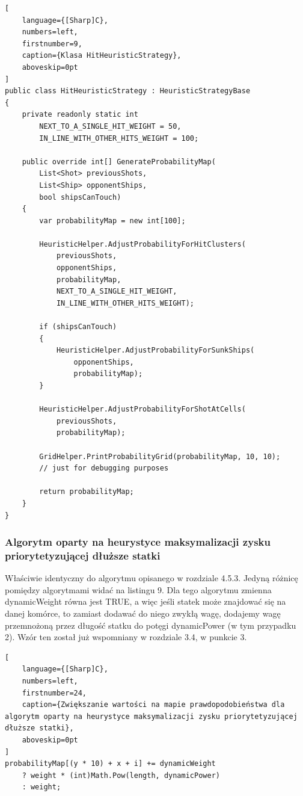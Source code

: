 \begin{addmargin}[10mm]{0mm}
\begin{lstlisting}[
    language={[Sharp]C},
    numbers=left,
    firstnumber=9,
    caption={Klasa HitHeuristicStrategy},
    aboveskip=0pt
]
public class HitHeuristicStrategy : HeuristicStrategyBase
{
    private readonly static int
        NEXT_TO_A_SINGLE_HIT_WEIGHT = 50,
        IN_LINE_WITH_OTHER_HITS_WEIGHT = 100;

    public override int[] GenerateProbabilityMap(
        List<Shot> previousShots,
        List<Ship> opponentShips,
        bool shipsCanTouch)
    {
        var probabilityMap = new int[100];

        HeuristicHelper.AdjustProbabilityForHitClusters(
            previousShots,
            opponentShips,
            probabilityMap,
            NEXT_TO_A_SINGLE_HIT_WEIGHT,
            IN_LINE_WITH_OTHER_HITS_WEIGHT);

        if (shipsCanTouch)
        {
            HeuristicHelper.AdjustProbabilityForSunkShips(
                opponentShips,
                probabilityMap);
        }

        HeuristicHelper.AdjustProbabilityForShotAtCells(
            previousShots,
            probabilityMap);

        GridHelper.PrintProbabilityGrid(probabilityMap, 10, 10);
        // just for debugging purposes

        return probabilityMap;
    }
}

\end{lstlisting}
\end{addmargin}

\subsubsection{Algorytm oparty na heurystyce maksymalizacji zysku priorytetyzującej dłuższe statki}
Właściwie identyczny do algorytmu opisanego w rozdziale 4.5.3. Jedyną różnicę pomiędzy algorytmami widać na listingu 9. Dla tego algorytmu zmienna dynamicWeight równa jest TRUE, a więc jeśli statek może znajdować się na danej komórce, to zamiast dodawać do niego zwykłą wagę, dodajemy wagę przemnożoną przez długość statku do potęgi dynamicPower (w tym przypadku 2). Wzór ten został już wspomniany w rozdziale 3.4, w punkcie 3.

\begin{addmargin}[10mm]{0mm}
\begin{lstlisting}[
    language={[Sharp]C},
    numbers=left,
    firstnumber=24,
    caption={Zwiększanie wartości na mapie prawdopodobieństwa dla algorytm oparty na heurystyce maksymalizacji zysku priorytetyzującej dłuższe statki},
    aboveskip=0pt
]
probabilityMap[(y * 10) + x + i] += dynamicWeight
    ? weight * (int)Math.Pow(length, dynamicPower)
    : weight;
\end{lstlisting}
\end{addmargin}

